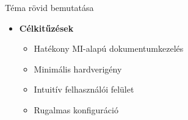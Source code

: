 \documentclass[aspectratio=169, 11pt]{beamer}
\begin{document}
\begin{frame}{Téma rövid bemutatása}
\begin{itemize}
        \item \textbf{Célkitűzések}
        \begin{itemize}
            \vspace{0.5em}
            \item Hatékony MI-alapú dokumentumkezelés  
            \vspace{0.5em}
            \item Minimális hardverigény  
            \vspace{0.5em}
            \item Intuitív felhasználói felület  
            \vspace{0.5em}
            \item Rugalmas konfiguráció  
        \end{itemize}
    \end{itemize}
\end{frame}
\end{document}
